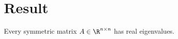 
\section*{Result}

Every symmetric matrix $A \in \R ^{n \times n}$ has real eigenvalues.

\blankpage